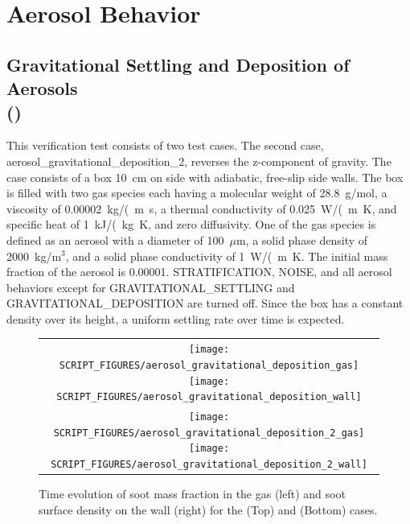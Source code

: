 \documentclass[11pt]{book}
\begin{document}
\section{Aerosol Behavior}
\subsection{Gravitational Settling and Deposition of Aerosols\\(\texorpdfstring{}{aerosol\_gravitational\_deposition})}
	\label{aerosol_gravitational_deposition}

This verification test consists of two test cases. The second case, {\ct aerosol\_gravitational\_deposition\_2}, reverses the z-component of gravity. The case consists of a box 10~cm on side with adiabatic, free-slip side walls. The box is filled with two gas species each having a molecular weight of 28.8~g/mol, a viscosity of 0.00002~\si{kg/(m.s}, a thermal conductivity of 0.025~\si{W/(m.K}, and specific heat of 1~\si{kJ/(kg.K}, and zero diffusivity. One of the gas species is defined as an aerosol with a diameter of 100~$\mu$m, a solid phase density of 2000~kg/m$^3$, and a solid phase conductivity of 1~\si{W/(m.K}. The initial mass fraction of the aerosol is 0.00001. {\ct STRATIFICATION}, {\ct NOISE}, and all aerosol behaviors except for {\ct GRAVITATIONAL\_SETTLING} and {\ct GRAVITATIONAL\_DEPOSITION} are turned off. Since the box has a constant density over its height, a uniform settling rate over time is expected.

\begin{figure}[ht]
	\centering
	\begin{tabular}{c}
		\texttt{[image: SCRIPT\_FIGURES/aerosol\_gravitational\_deposition\_gas]}
		\texttt{[image: SCRIPT\_FIGURES/aerosol\_gravitational\_deposition\_wall]} \\
		\texttt{[image: SCRIPT\_FIGURES/aerosol\_gravitational\_deposition\_2\_gas]}
		\texttt{[image: SCRIPT\_FIGURES/aerosol\_gravitational\_deposition\_2\_wall]}
	\end{tabular}
	\caption[Gas phase soot mass fractions and wall surface densities for gravitational deposition]{Time evolution of soot mass fraction in the gas (left) and soot surface density on the wall (right) for the  (Top) and  (Bottom) cases.}
	\label{fig:gravitational_deposition}
\end{figure}
\end{document}
